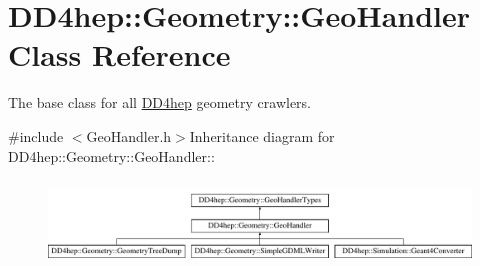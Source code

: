 \hypertarget{class_d_d4hep_1_1_geometry_1_1_geo_handler}{
\section{DD4hep::Geometry::GeoHandler Class Reference}
\label{class_d_d4hep_1_1_geometry_1_1_geo_handler}
}


The base class for all \hyperlink{namespace_d_d4hep}{DD4hep} geometry crawlers.  


{\ttfamily \#include $<$GeoHandler.h$>$}Inheritance diagram for DD4hep::Geometry::GeoHandler::\begin{figure}[H]
\begin{center}
\leavevmode
\includegraphics[height=2.29508cm]{class_d_d4hep_1_1_geometry_1_1_geo_handler}
\end{center}
\end{figure}
